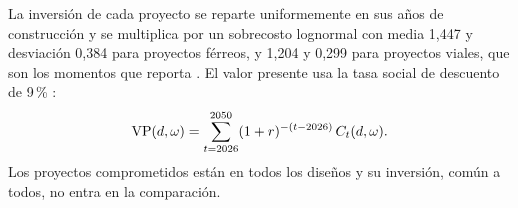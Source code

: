 La inversión de cada proyecto se reparte uniformemente en sus años de construcción y se multiplica por
un sobrecosto lognormal con media 1,447 y desviación 0,384 para proyectos férreos, y 1,204 y 0,299 para
proyectos viales, que son los momentos que reporta \citet{flyvbjerg2005wb}. El valor presente usa la
tasa social de descuento de 9\,\% \citep{dnp2022}:
\begin{equation}\label{eq:vp}
\mathrm{VP}(d,\omega)=\sum_{t=2026}^{2050}(1+r)^{-(t-2026)}\,C_t(d,\omega).
\end{equation}
Los proyectos comprometidos están en todos los diseños y su inversión, común a todos, no entra en la
comparación.
